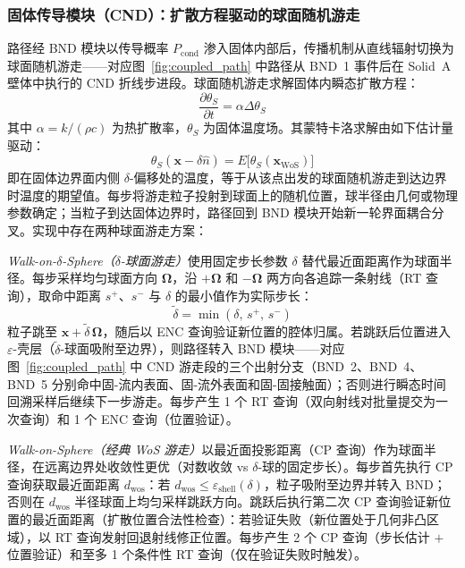 \subsubsection{固体传导模块（CND）：扩散方程驱动的球面随机游走}

路径经 BND 模块以传导概率 $P_\text{cond}$ 渗入固体内部后，传播机制从直线辐射切换为球面随机游走——对应图~\ref{fig:coupled_path} 中路径从 BND~1 事件后在 Solid~A 壁体中执行的 CND 折线步进段。球面随机游走求解固体内瞬态扩散方程\cite{batiCouplingConductionConvection2023}：
\begin{equation}
  \frac{\partial \theta_S}{\partial t} = \alpha \Delta \theta_S
  \label{eq:cnd-diffusion}
\end{equation}
其中 $\alpha = k/(\rho c)$ 为热扩散率，$\theta_S$ 为固体温度场。其蒙特卡洛求解由如下估计量驱动：
\begin{equation}
  \theta_S(\mathbf{x} - \delta\hat{n}) = E\bigl[\theta_S(\mathbf{x}_\text{WoS})\bigr]
  \label{eq:cnd-wos-estimator}
\end{equation}
即在固体边界面内侧 $\delta$-偏移处的温度，等于从该点出发的球面随机游走到达边界时温度的期望值。每步将游走粒子投射到球面上的随机位置，球半径由几何或物理参数确定；当粒子到达固体边界时，路径回到 BND 模块开始新一轮界面耦合分叉。实现中存在两种球面游走方案：

\textit{Walk-on-$\delta$-Sphere（$\delta$-球面游走）}使用固定步长参数 $\delta$ 替代最近面距离作为球面半径\cite{batiCouplingConductionConvection2023}。每步采样均匀球面方向 $\boldsymbol{\Omega}$，沿 $+\boldsymbol{\Omega}$ 和 $-\boldsymbol{\Omega}$ 两方向各追踪一条射线（RT 查询），取命中距离 $s^+$、$s^-$ 与 $\delta$ 的最小值作为实际步长：
\begin{equation}
  \tilde{\delta} = \min(\delta,\,s^+,\,s^-)
  \label{eq:cnd-ds-step}
\end{equation}
粒子跳至 $\mathbf{x} + \tilde{\delta}\,\boldsymbol{\Omega}$，随后以 ENC 查询验证新位置的腔体归属。若跳跃后位置进入 $\varepsilon$-壳层（$\tilde{\delta}$-球面吸附至边界），则路径转入 BND 模块——对应图~\ref{fig:coupled_path} 中 CND 游走段的三个出射分支（BND~2、BND~4、BND~5 分别命中固-流内表面、固-流外表面和固-固接触面）；否则进行瞬态时间回溯采样后继续下一步游走。每步产生 1 个 RT 查询（双向射线对批量提交为一次查询）和 1 个 ENC 查询（位置验证）。

\textit{Walk-on-Sphere（经典 WoS 游走）}以最近面投影距离（CP 查询）作为球面半径，在远离边界处收敛性更优（对数收敛 vs $\delta$-球的固定步长）。每步首先执行 CP 查询获取最近面距离 $d_\text{wos}$：若 $d_\text{wos} \leq \varepsilon_\text{shell}(\delta)$，粒子吸附至边界并转入 BND；否则在 $d_\text{wos}$ 半径球面上均匀采样跳跃方向。跳跃后执行第二次 CP 查询验证新位置的最近面距离（扩散位置合法性检查）：若验证失败（新位置处于几何非凸区域），以 RT 查询发射回退射线修正位置。每步产生 2 个 CP 查询（步长估计 $+$ 位置验证）和至多 1 个条件性 RT 查询（仅在验证失败时触发）。

